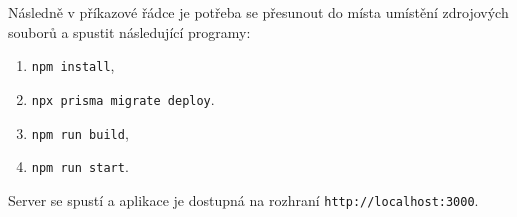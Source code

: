 \documentclass[czech,semestral]{diploma}
\begin{document}
Následně v příkazové řádce je potřeba se přesunout do místa umístění zdrojových souborů a spustit následující programy:
\begin{enumerate}
    \item \texttt{npm install},
    \item \texttt{npx prisma migrate deploy}.
    \item \texttt{npm run build},
    \item \texttt{npm run start}.
\end{enumerate}
Server se spustí a aplikace je dostupná na rozhraní \texttt{http://localhost:3000}.
\end{document}
